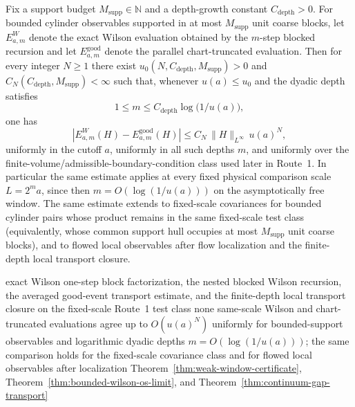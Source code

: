 \begin{theorem}\label{thm:wilson-return}
Fix a support budget $M_{\mathrm{supp}}\in\mathbb N$ and a depth-growth constant $C_{\mathrm{depth}}>0$. For bounded cylinder observables supported in at most $M_{\mathrm{supp}}$ unit coarse blocks, let $E^{W}_{a,m}$ denote the exact Wilson evaluation obtained by the $m$-step blocked recursion and let $E^{\mathrm{good}}_{a,m}$ denote the parallel chart-truncated evaluation. Then for every integer $N\geq 1$ there exist $u_0(N,C_{\mathrm{depth}},M_{\mathrm{supp}})>0$ and $C_N(C_{\mathrm{depth}},M_{\mathrm{supp}})<\infty$ such that, whenever $u(a)\leq u_0$ and the dyadic depth satisfies
\[
  1\le m\le C_{\mathrm{depth}}\log\!\bigl(1/u(a)\bigr),
\]
one has
\[
  |E^{W}_{a,m}(H)-E^{\mathrm{good}}_{a,m}(H)|\leq C_N\,\|H\|_{L^\infty}\,u(a)^N,
\]
uniformly in the cutoff $a$, uniformly in all such depths $m$, and uniformly over the finite-volume/admissible-boundary-condition class used later in Route~1. In particular the same estimate applies at every fixed physical comparison scale $L=2^m a$, since then $m=O(\log(1/u(a)))$ on the asymptotically free window. The same estimate extends to fixed-scale covariances for bounded cylinder pairs whose product remains in the same fixed-scale test class (equivalently, whose common support hull occupies at most $M_{\mathrm{supp}}$ unit coarse blocks), and to flowed local observables after flow localization and the finite-depth local transport closure.
\end{theorem}
\dependencyledger
  {exact Wilson one-step block factorization, the nested blocked Wilson recursion, the averaged good-event transport estimate, and the finite-depth local transport closure on the fixed-scale Route~1 test class}
  {none}
  {same-scale Wilson and chart-truncated evaluations agree up to $O(u(a)^N)$ uniformly for bounded-support observables and logarithmic dyadic depths $m=O(\log(1/u(a)))$; the same comparison holds for the fixed-scale covariance class and for flowed local observables after localization}
  {Theorem~\ref{thm:weak-window-certificate}, Theorem~\ref{thm:bounded-wilson-os-limit}, and Theorem~\ref{thm:continuum-gap-transport}}

